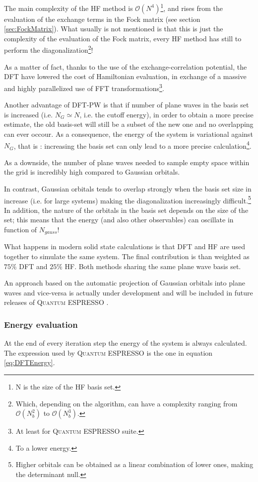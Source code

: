 \documentclass[a4paper,12pt]{article}
\newcommand\QE{\textsc{Quantum} ESPRESSO }
\newcommand\bigO{\mathcal{O}}
\begin{document}
The main complexity of the HF method is $\bigO(N^4)$\footnote{N is the size of the HF basis set.}, and rises from the evaluation of the exchange terms in the Fock matrix (see section \ref{sec:FockMatrix}). 
What usually is not mentioned is that this is just the complexity of the evaluation of the Fock matrix, every HF method has still to perform the diagonalization\footnote{Which, depending on the algorithm, can have a complexity ranging from $\bigO(N_{b}^2)$ to $\bigO(N_{b}^3)$.}!

As a matter of fact, thanks to the use of the exchange-correlation potential, the DFT have lowered the cost of Hamiltonian evaluation, in exchange of a massive and highly parallelized use of FFT transformations\footnote{At least for \QE suite.}.


Another advantage of DFT-PW is that if number of plane waves in the basis set is increased (i.e. $N_G \simeq N$, i.e. the cutoff energy), in order to obtain a more precise estimate, the old basis-set will still be a subset of the new one and no overlapping can ever occour. 
As a consequence, the energy of the system is variational against $N_G$, that is : increasing the basis set can only lead to a more precise calculation\footnote{To a lower energy.}.

As a downside, the number of plane waves needed to sample empty space within the grid is incredibly high compared to Gaussian orbitals.

In contrast, Gaussian orbitals tends to overlap strongly when the basis set size in increase (i.e. for large systems) making the diagonalization increasingly difficult.\footnote{Higher orbitals can be obtained as a linear combination of lower ones, making the determinant null.} 
In addition, the nature of the orbitals in the basis set depends on the size of the set; 
	this means that the energy (and also other observables) can oscillate in function of $N_{gauss}$!

What happens in modern solid state calculations is that DFT and HF are used together to simulate the same system. The final contribution is than weighted as $75\%$ DFT and $25\%$ HF. Both methods sharing the same plane wave basis set.

An approach based on the automatic projection of Gaussian orbitals into plane waves and vice-versa 
is actually under development and will be included in future releases of \QE.

\subsubsection{Energy evaluation}
At the end of every iteration step the energy of the system is always calculated. The expression used by \QE is the one in equation \eqref{eq:DFTEnergy}.
\end{document}
